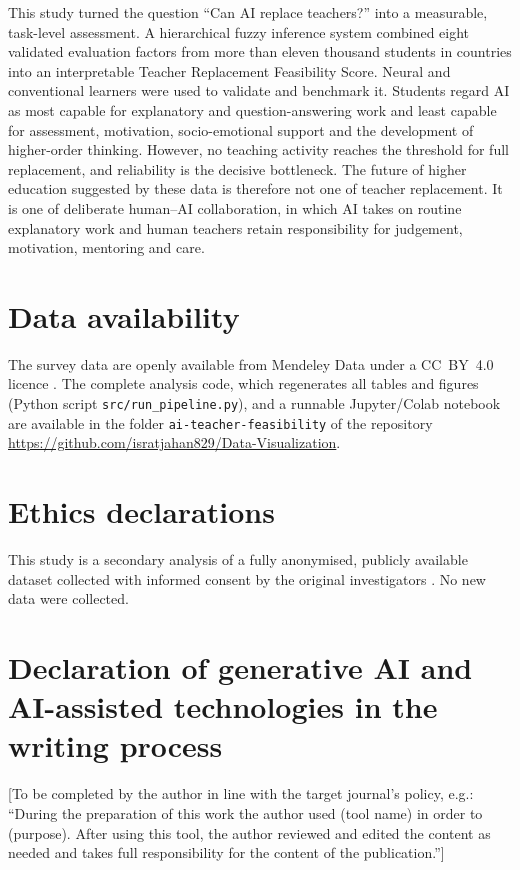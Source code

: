 \documentclass[fleqn,10pt]{wlscirep}
\theoremstyle{remark}
\begin{document}
This study turned the question ``Can AI replace teachers?'' into a measurable, task-level assessment. A hierarchical fuzzy inference system combined eight validated evaluation factors from more than eleven thousand students in \Ncountries{} countries into an interpretable Teacher Replacement Feasibility Score. Neural and conventional learners were used to validate and benchmark it. Students regard AI as most capable for explanatory and question-answering work and least capable for assessment, motivation, socio-emotional support and the development of higher-order thinking. However, no teaching activity reaches the threshold for full replacement, and reliability is the decisive bottleneck. The future of higher education suggested by these data is therefore not one of teacher replacement. It is one of deliberate human--AI collaboration, in which AI takes on routine explanatory work and human teachers retain responsibility for judgement, motivation, mentoring and care.

\section*{Data availability}
The survey data are openly available from Mendeley Data under a CC~BY~4.0 licence \cite{ravselj2024data}. The complete analysis code, which regenerates all tables and figures (Python script \texttt{src/run\_pipeline.py}), and a runnable Jupyter/Colab notebook are available in the folder \texttt{ai-teacher-feasibility} of the repository\\ \url{https://github.com/isratjahan829/Data-Visualization}.

\section*{Ethics declarations}
This study is a secondary analysis of a fully anonymised, publicly available dataset collected with informed consent by the original investigators \cite{ravselj2025}. No new data were collected.

\section*{Declaration of generative AI and AI-assisted technologies in the writing process}
[To be completed by the author in line with the target journal's policy, e.g.: ``During the preparation of this work the author used (tool name) in order to (purpose). After using this tool, the author reviewed and edited the content as needed and takes full responsibility for the content of the publication.'']
\end{document}
